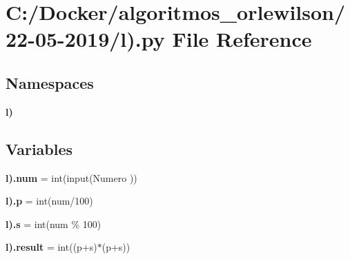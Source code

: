\section{C\+:/\+Docker/algoritmos\+\_\+orlewilson/22-\/05-\/2019/l).py File Reference}
\label{l_08_8py}
\subsection*{Namespaces}
\begin{DoxyCompactItemize}
\item 
 \textbf{ l)}
\end{DoxyCompactItemize}
\subsection*{Variables}
\begin{DoxyCompactItemize}
\item 
\textbf{ l).\+num} = int(input(\textquotesingle{}Numero \textquotesingle{}))
\item 
\textbf{ l).\+p} = int(num/100)
\item 
\textbf{ l).\+s} = int(num \% 100)
\item 
\textbf{ l).\+result} = int((p+s)$\ast$(p+s))
\end{DoxyCompactItemize}

